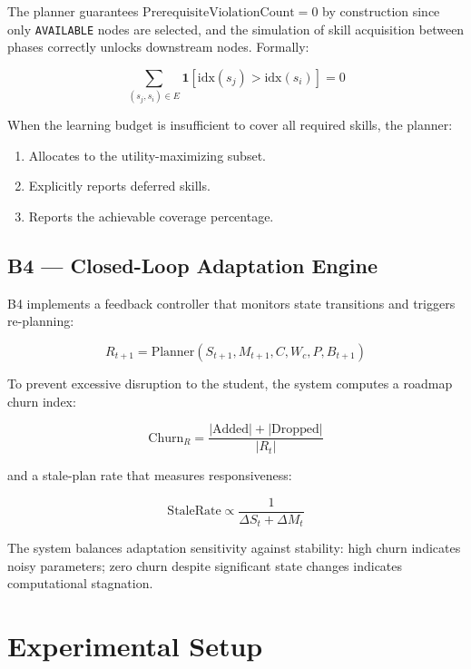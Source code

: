 \documentclass[conference]{IEEEtran}
\begin{document}
The planner guarantees $\text{PrerequisiteViolationCount} = 0$ by construction since only \texttt{AVAILABLE} nodes are selected, and the simulation of skill acquisition between phases correctly unlocks downstream nodes. Formally:

\begin{equation}
\sum_{(s_j, s_i) \in E} \mathbf{1}[\text{idx}(s_j) > \text{idx}(s_i)] = 0
\label{eq:violation}
\end{equation}

When the learning budget is insufficient to cover all required skills, the planner:
\begin{enumerate}
    \item Allocates to the utility-maximizing subset.
    \item Explicitly reports deferred skills.
    \item Reports the achievable coverage percentage.
\end{enumerate}

\subsection{B4 --- Closed-Loop Adaptation Engine}

B4 implements a feedback controller that monitors state transitions and triggers re-planning:

\begin{equation}
R_{t+1} = \text{Planner}(S_{t+1}, M_{t+1}, C, W_c, P, B_{t+1})
\label{eq:adaptation}
\end{equation}

To prevent excessive disruption to the student, the system computes a roadmap churn index:

\begin{equation}
\text{Churn}_R = \frac{|\text{Added}| + |\text{Dropped}|}{|R_t|}
\label{eq:churn}
\end{equation}

\noindent and a stale-plan rate that measures responsiveness:

\begin{equation}
\text{StaleRate} \propto \frac{1}{\Delta S_t + \Delta M_t}
\label{eq:stale}
\end{equation}

\noindent The system balances adaptation sensitivity against stability: high churn indicates noisy parameters; zero churn despite significant state changes indicates computational stagnation.

\section{Experimental Setup}
\end{document}
